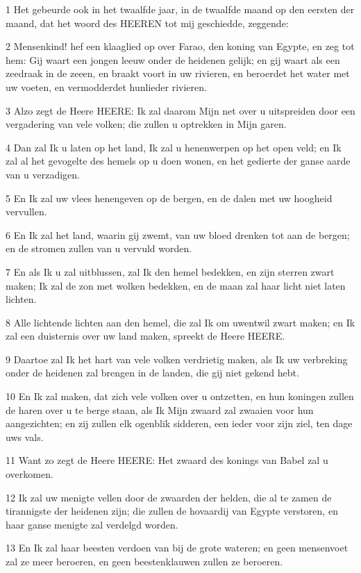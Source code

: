 \par 1 Het gebeurde ook in het twaalfde jaar, in de twaalfde maand op den eersten der maand, dat het woord des HEEREN tot mij geschiedde, zeggende:
\par 2 Mensenkind! hef een klaaglied op over Farao, den koning van Egypte, en zeg tot hem: Gij waart een jongen leeuw onder de heidenen gelijk; en gij waart als een zeedraak in de zeeen, en braakt voort in uw rivieren, en beroerdet het water met uw voeten, en vermodderdet hunlieder rivieren.
\par 3 Alzo zegt de Heere HEERE: Ik zal daarom Mijn net over u uitspreiden door een vergadering van vele volken; die zullen u optrekken in Mijn garen.
\par 4 Dan zal Ik u laten op het land, Ik zal u henenwerpen op het open veld; en Ik zal al het gevogelte des hemels op u doen wonen, en het gedierte der ganse aarde van u verzadigen.
\par 5 En Ik zal uw vlees henengeven op de bergen, en de dalen met uw hoogheid vervullen.
\par 6 En Ik zal het land, waarin gij zwemt, van uw bloed drenken tot aan de bergen; en de stromen zullen van u vervuld worden.
\par 7 En als Ik u zal uitblussen, zal Ik den hemel bedekken, en zijn sterren zwart maken; Ik zal de zon met wolken bedekken, en de maan zal haar licht niet laten lichten.
\par 8 Alle lichtende lichten aan den hemel, die zal Ik om uwentwil zwart maken; en Ik zal een duisternis over uw land maken, spreekt de Heere HEERE.
\par 9 Daartoe zal Ik het hart van vele volken verdrietig maken, als Ik uw verbreking onder de heidenen zal brengen in de landen, die gij niet gekend hebt.
\par 10 En Ik zal maken, dat zich vele volken over u ontzetten, en hun koningen zullen de haren over u te berge staan, als Ik Mijn zwaard zal zwaaien voor hun aangezichten; en zij zullen elk ogenblik sidderen, een ieder voor zijn ziel, ten dage uws vals.
\par 11 Want zo zegt de Heere HEERE: Het zwaard des konings van Babel zal u overkomen.
\par 12 Ik zal uw menigte vellen door de zwaarden der helden, die al te zamen de tirannigste der heidenen zijn; die zullen de hovaardij van Egypte verstoren, en haar ganse menigte zal verdelgd worden.
\par 13 En Ik zal haar beesten verdoen van bij de grote wateren; en geen mensenvoet zal ze meer beroeren, en geen beestenklauwen zullen ze beroeren.
